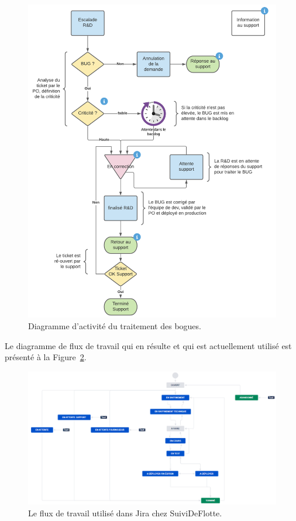\begin{figure}[h]
    \centering
    \includegraphics[width=\textwidth]{img/lifecycle-of-bugs}
    \caption{Diagramme d'activité du traitement des bogues.}
    \label{fig:lifecycle-of-bugs}
\end{figure}

Le diagramme de flux de travail qui en résulte et qui est actuellement utilisé est présenté à la Figure~\ref{fig:workflow}.

\begin{figure}[h]
    \centering
    \includegraphics[width=\textwidth]{img/workflow-sdfn}
    \caption{Le flux de travail utilisé dans Jira chez SuiviDeFlotte.}
    \label{fig:workflow}
\end{figure}

